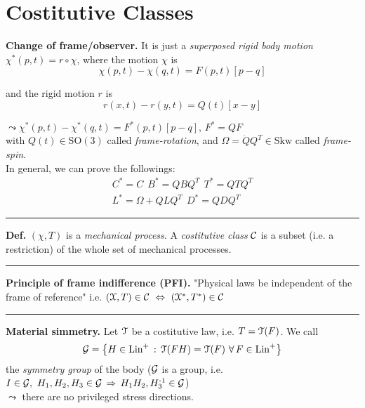 
\vspace{-1em}


\section{\texorpdfstring{\color{red}Costitutive Classes}{}}


\textbf{Change of frame/observer.} It is just a \emph{superposed rigid body motion} $\chi^*(p,t)=r\circ \chi$, where the motion $\chi$ is
\begin{equation*}
\chi(p,t)-\chi(q,t)=F(p,t)[p-q]
\end{equation*}

and the rigid motion $r$ is
\begin{equation*}
r(x,t)-r(y,t)=Q(t)[x-y]
\end{equation*}

$\leadsto \chi^*(p,t)-\chi^*(q,t)=F^*(p,t)[p-q],\,\boxed{F^*=QF}$ \\
with $Q(t)\in\text{SO}(3)$ called \emph{frame-rotation}, and $\Omega=\dot{Q}Q^T\in\text{Skw}$ called \emph{frame-spin}. \\
In general, we can prove the followings:
\begin{equation*}
\begin{gathered}
C^*=C\ \ B^*=QBQ^T\ \ T^*=QTQ^T \\
L^*=\Omega+QLQ^T\ \ D^*=QDQ^T
\end{gathered}    \tag{$\circledast$}
\end{equation*}

\rule{0.31\textwidth}{0.2pt}
\smallskip

\textbf{Def.} $(\chi,T)$ is a \emph{mechanical process}. A \emph{costitutive class} $\mathcal{C}$ is a subset (i.e. a restriction) of the whole set of mechanical processes.

\rule{0.31\textwidth}{0.2pt}
\smallskip

\textbf{Principle of frame indifference (PFI).} "Physical laws be independent of the frame of reference" i.e. $(\chi,T)\in\Cc\ \Leftrightarrow\ (\chi^*,T^*)\in\Cc$

\rule{0.31\textwidth}{0.2pt}
\smallskip

\textbf{Material simmetry.} Let $\EuScript{T}$ be a costitutive law, i.e. $T=\EuScript{T}(F)$. We call
\begin{equation*}
\Gc=\left\{ H\in\text{Lin}^+\,:\,\ti(FH)=\ti(F)\ \forall\, F\in \text{Lin}^+ \right\}
\end{equation*}
the \emph{symmetry group} of the body ($\mathcal{G}$ is a group, i.e. $I\in \mathcal{G},\ H_1,H_2,H_3\in \mathcal{G}\,\Rightarrow\,H_1H_2,H_3^{\text{-}1}\in \mathcal{G}$) \\ $\leadsto$ there are no privileged stress directions.

